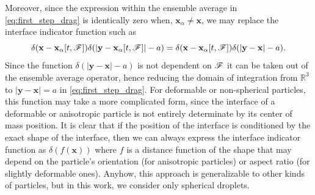 Moreover, since the expression within the ensemble average in \ref{eq:first_step_drag} is identically zero when, $\textbf{x}_\alpha \neq \textbf{x}$, we may replace the interface indicator function such as   
\begin{equation}
    \delta(\textbf{x}-\textbf{x}_\alpha[t,\FF])\delta(|\textbf{y} - \textbf{x}_{\alpha}[t,\FF]|-a) = \delta(\textbf{x}-\textbf{x}_\alpha[t,\FF])\delta(|\textbf{y} - \textbf{x}|-a). 
    \label{eq:from_R3_to_S}
\end{equation}
Since the function $\delta(|\textbf{y} - \textbf{x}|-a)$ is not dependent on $\mathscr{F}$ it can be taken out of the ensemble average operator, hence reducing the domain of integration from $\mathbb{R}^3$ to $|\textbf{y}-\textbf{x}| = a$ in \ref{eq:first_step_drag}. 
For deformable or non-spherical particles, this function may take a more complicated form, since the interface of a deformable or anisotropic particle is not entirely determinate by its center of mass position. 
It is clear that if the position of the interface is conditioned by the exact shape of the interface, then we can always express the interface indicator function as $\delta(f(\textbf{x}))$ where $f$ is a distance function of the shape that may depend on the particle's orientation (for anisotropic particles) or aspect ratio (for slightly deformable ones). 
Anyhow, this approach is generalizable to other kinds of particles, but in this work, we consider only spherical droplets. 


